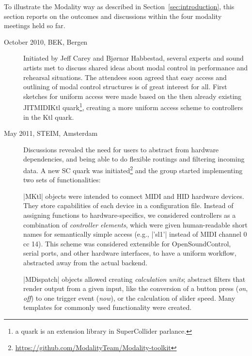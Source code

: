 \documentclass{article}
\newcommand{\todo}[1] {\emph{\textbf{TODO:} #1}}
\begin{document}
To illustrate the Modality way as described in Section~\ref{sec:introduction}, this section reports on the outcomes and discussions within the four modality meetings held so far.

\begin{description}
	\item[October 2010, BEK, Bergen] Initiated by Jeff Carey and Bj\o{}rnar Habbestad, several experts and sound artists met to discuss shared ideas about modal control in performance and rehearsal situations.
	The attendees soon agreed that easy access and outlining of modal control structures is of great interest for all. First sketches for uniform access were made based on the then already existing JITMIDIKtl quark\footnote{a quark is an extension library in SuperCollider parlance.}, creating a more uniform access scheme to controllers in the Ktl quark. 
	
	
	\item[May 2011, STEIM, Amsterdam] Discussions revealed the need for users to abstract from hardware dependencies, and being able to do flexible routings and filtering incoming data. 
	A new SC quark was initiated\footnote{\url{https://github.com/ModalityTeam/Modality-toolkit}} and the group started implementing two sets of functionalities:

	|MKtl| objects were intended to connect MIDI and HID hardware devices. 
	They store capabilities of each device in a configuration file. 
	Instead of assigning functions to hardware-specifics, we considered controllers as a combination of \emph{controller elements}, which were given human-readable short names for semantically simple access (e.g., |'sl1'| instead of MIDI channel 0 cc 14).
This scheme was considered extensible for OpenSoundControl, serial ports, and other hardware interfaces, to have a uniform workflow, abstracted away from the actual backend.

|MDispatch| objects allowed creating \emph{calculation units}; abstract filters that render output from a given input, like the conversion of a button press (\emph{on}, \emph{off}) to one trigger event (\emph{now}), or the calculation of slider speed. Many templates for commonly used functionality were created.


\end{description}
\end{document}

